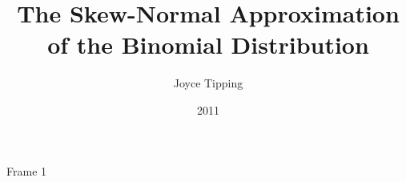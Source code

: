 \documentclass{beamer}
\title{The Skew-Normal Approximation of the Binomial Distribution}
\author{Joyce Tipping}
\date{2011}
\begin{document}
\frame{\titlepage}

\begin{frame}
  Frame 1
\end{frame}
\end{document}
